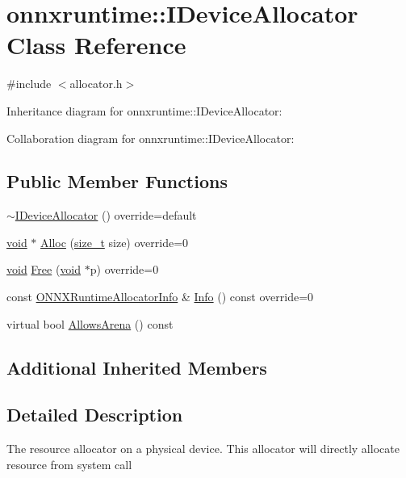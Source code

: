 \hypertarget{classonnxruntime_1_1IDeviceAllocator}{}\section{onnxruntime\+:\+:I\+Device\+Allocator Class Reference}
\label{classonnxruntime_1_1IDeviceAllocator}


{\ttfamily \#include $<$allocator.\+h$>$}



Inheritance diagram for onnxruntime\+:\+:I\+Device\+Allocator\+:


Collaboration diagram for onnxruntime\+:\+:I\+Device\+Allocator\+:
\subsection*{Public Member Functions}
\begin{DoxyCompactItemize}
\item 
\mbox{\hyperlink{classonnxruntime_1_1IDeviceAllocator_a1b7c070676ed509fe8fede5ab1d15fe3}{$\sim$\+I\+Device\+Allocator}} () override=default
\item 
\mbox{\hyperlink{mlasi_8h_a88f941d423cb2a819b70a1358982b1a6}{void}} $\ast$ \mbox{\hyperlink{classonnxruntime_1_1IDeviceAllocator_aa703af32705cabad8c9f69e60efcfb6b}{Alloc}} (\mbox{\hyperlink{mlasi_8h_a503efbc1c6e50825320ad909366b78ab}{size\+\_\+t}} size) override=0
\item 
\mbox{\hyperlink{mlasi_8h_a88f941d423cb2a819b70a1358982b1a6}{void}} \mbox{\hyperlink{classonnxruntime_1_1IDeviceAllocator_aeabef1862123ae6d9478199db974e32a}{Free}} (\mbox{\hyperlink{mlasi_8h_a88f941d423cb2a819b70a1358982b1a6}{void}} $\ast$p) override=0
\item 
const \mbox{\hyperlink{structONNXRuntimeAllocatorInfo}{O\+N\+N\+X\+Runtime\+Allocator\+Info}} \& \mbox{\hyperlink{classonnxruntime_1_1IDeviceAllocator_a46b848cd863bcd50d1e63d48ad96c63c}{Info}} () const override=0
\item 
virtual bool \mbox{\hyperlink{classonnxruntime_1_1IDeviceAllocator_aac1ebfa9311d21dbfad28d36c568e0b3}{Allows\+Arena}} () const
\end{DoxyCompactItemize}
\subsection*{Additional Inherited Members}


\subsection{Detailed Description}
The resource allocator on a physical device. This allocator will directly allocate resource from system call 

